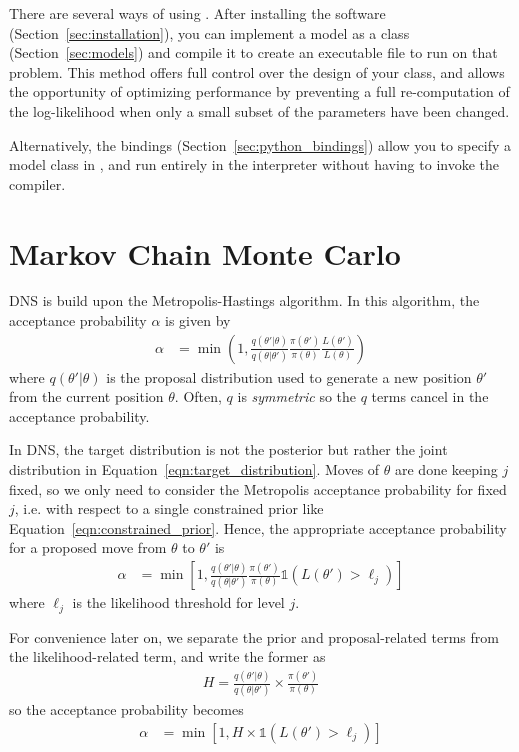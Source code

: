 \documentclass[article]{jss}
\newcommand{\params}{\theta}
\begin{document}
There are several ways of using . After installing the software
(Section~\ref{sec:installation}), you can implement a model as
a  class
(Section~\ref{sec:models}) and compile it to create an executable file
to run  on that problem. This method offers full control over the
design of your class, and allows the opportunity of optimizing
performance by preventing a full re-computation of the log-likelihood when
only a small subset of the parameters have been changed.

Alternatively, the 
bindings (Section~\ref{sec:python_bindings}) allow you
to specify a model class in , and run  entirely
in the  interpreter without having to invoke the 
compiler.

\section{Markov Chain Monte Carlo}\label{sec:mcmc}
DNS is build upon the Metropolis-Hastings algorithm.
In this algorithm, the acceptance probability $\alpha$
is given by
\begin{align}
\alpha &= \min\left(1,
\frac{q(\params'|\params)}{q(\params | \params')}
\frac{\pi(\params')}{\pi(\params)}\frac{L(\params')}{L(\params)}
\right)
\end{align}
where $q(\theta' | \theta)$ is the proposal distribution used to generate
a new position $\theta'$ from the current position $\theta$. Often,
$q$ is {\em symmetric} so the $q$ terms cancel in the acceptance probability.

In DNS, the target distribution is not the posterior but rather
the joint distribution in Equation~\ref{eqn:target_distribution}.
Moves of $\theta$ are done keeping $j$ fixed, so we only need
to consider the Metropolis acceptance probability for fixed $j$,
i.e. with respect to a single constrained prior like
Equation~\ref{eqn:constrained_prior}.
Hence, the appropriate acceptance probability
for a proposed move from $\theta$ to $\theta'$ is
\begin{align}
\alpha &= \min\left[1,
\frac{q(\params'|\params)}{q(\params | \params')}
\frac{\pi(\params')}{\pi(\params)}
\mathds{1}\left(L(\params') > \ell_j\right)
\right]
\label{eqn:log_hastings}
\end{align}
where $\ell_j$ is the likelihood threshold for level $j$.

For convenience later on, we 
separate the prior and proposal-related terms from
the likelihood-related term, and write the former as
\begin{align}
H = \frac{q(\params'|\params)}{q(\params | \params')}
\times \frac{\pi(\params')}{\pi(\params)}
\end{align}
so the acceptance probability becomes
\begin{align}
\alpha &= \min\left[1,
H\times
\mathds{1}\left(L(\params') > \ell_j\right)
\right]
\end{align}
\end{document}
